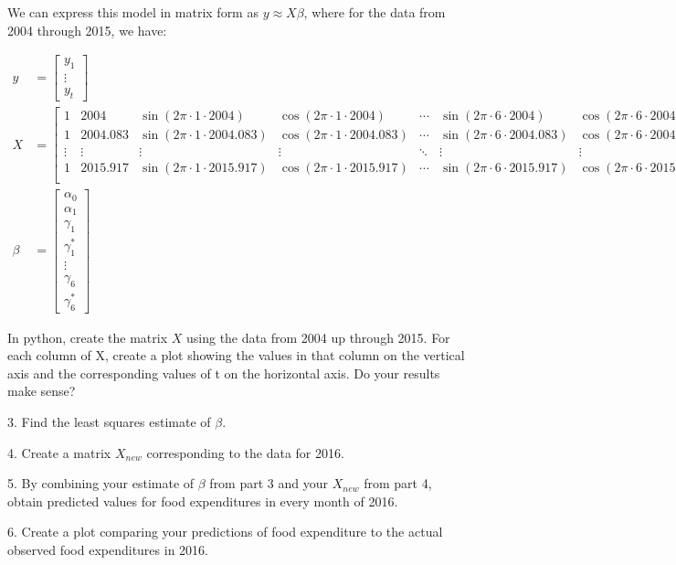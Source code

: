 \documentclass[]{article}
\begin{document}
We can express this model in matrix form as $y \approx X \beta$, where for the data from
2004 through 2015, we have:

\begin{align*}
y &= \begin{bmatrix} y_1 \\ \vdots \\ y_t \end{bmatrix} \\
X &= \begin{bmatrix}
1 & 2004 & \sin\left( 2 \pi \cdot 1 \cdot 2004 \right) & \cos\left( 2 \pi \cdot 1 \cdot 2004 \right) & \cdots & \sin\left( 2 \pi \cdot 6 \cdot 2004 \right) & \cos\left( 2 \pi \cdot 6 \cdot 2004 \right) \\
1 & 2004.083 & \sin\left( 2 \pi \cdot 1 \cdot 2004.083 \right) & \cos\left( 2 \pi \cdot 1 \cdot 2004.083 \right) & \cdots & \sin\left( 2 \pi \cdot 6 \cdot 2004.083 \right) & \cos\left( 2 \pi \cdot 6 \cdot 2004.083 \right) \\
\vdots & \vdots & \vdots & \vdots & \ddots & \vdots & \vdots \\
1 & 2015.917 & \sin\left( 2 \pi \cdot 1 \cdot 2015.917 \right) & \cos\left( 2 \pi \cdot 1 \cdot 2015.917 \right) & \cdots & \sin\left( 2 \pi \cdot 6 \cdot 2015.917 \right) & \cos\left( 2 \pi \cdot 6 \cdot 2015.917 \right) \\
\end{bmatrix} \\
\beta &= \begin{bmatrix} \alpha_0 \\ \alpha_1 \\ \gamma_1 \\ \gamma^*_1 \\ \vdots \\ \gamma_6 \\ \gamma^*_6 \end{bmatrix}
\end{align*}


In python, create the matrix $X$ using the data from 2004 up through 2015.  For each column of X, create a plot showing the values in that column on the vertical axis and the corresponding values of t on the horizontal axis.  Do your results make sense?

3. Find the least squares estimate of $\beta$.

4. Create a matrix $X_{new}$ corresponding to the data for 2016.

5. By combining your estimate of $\beta$ from part 3 and your $X_{new}$ from part 4, obtain predicted values for food expenditures in every month of 2016.

6. Create a plot comparing your predictions of food expenditure to the actual observed food expenditures in 2016.
\end{document}
